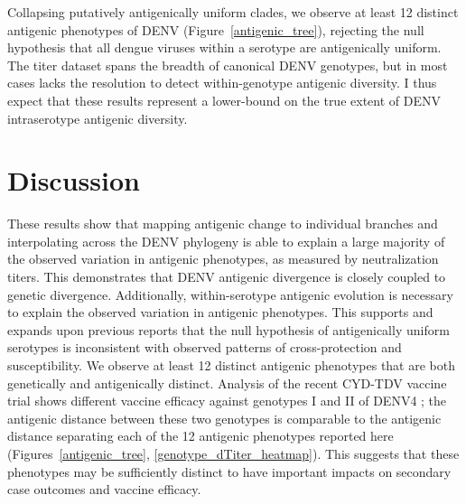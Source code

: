 Collapsing putatively antigenically uniform clades, we observe at least 12 distinct antigenic phenotypes of DENV (Figure~\ref{antigenic_tree}), rejecting the null hypothesis that all dengue viruses within a serotype are antigenically uniform.
The titer dataset spans the breadth of canonical DENV genotypes, but in most cases lacks the resolution to detect within-genotype antigenic diversity.
I thus expect that these results represent a lower-bound on the true extent of DENV intraserotype antigenic diversity.


\section{Discussion}
These results show that mapping antigenic change to individual branches and interpolating across the DENV phylogeny is able to explain a large majority of the observed variation in antigenic phenotypes, as measured by neutralization titers.
This demonstrates that DENV antigenic divergence is closely coupled to genetic divergence.
Additionally, within-serotype antigenic evolution is necessary to explain the observed variation in antigenic phenotypes.
This supports and expands upon previous reports \citep{katzelnick2015dengue} that the null hypothesis of antigenically uniform serotypes is inconsistent with observed patterns of cross-protection and susceptibility.
We observe at least 12 distinct antigenic phenotypes that are both genetically and antigenically distinct.
Analysis of the recent CYD-TDV vaccine trial shows different vaccine efficacy against genotypes I and II of DENV4 \citep{juraska2018viral}; the antigenic distance between these two genotypes is comparable to the antigenic distance separating each of the 12 antigenic phenotypes reported here  (Figures~\ref{antigenic_tree}, \ref{genotype_dTiter_heatmap}).
This suggests that these phenotypes may be sufficiently distinct to have important impacts on secondary case outcomes and vaccine efficacy.


